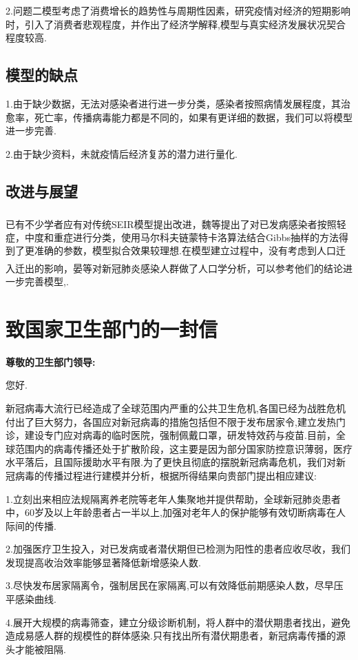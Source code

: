 \documentclass{whutmod}
\newcommand{\upcite}[1]{\textsuperscript{\textsuperscript{\cite{#1}}}}
\begin{document}
	2.问题二模型考虑了消费增长的趋势性与周期性因素，研究疫情对经济的短期影响时，引入了消费者悲观程度，并作出了经济学解释,模型与真实经济发展状况契合程度较高.
	
	\subsection{模型的缺点}
	1.由于缺少数据，无法对感染者进行进一步分类，感染者按照病情发展程度，其治愈率，死亡率，传播病毒能力都是不同的，如果有更详细的数据，我们可以将模型进一步完善.
	
	2.由于缺少资料，未就疫情后经济复苏的潜力进行量化.
	
	\subsection{改进与展望}
	已有不少学者应有对传统SEIR模型提出改进，魏等\upcite{bib:two}提出了对已发病感染者按照轻症，中度和重症进行分类，使用马尔科夫链蒙特卡洛算法结合Gibbs抽样的方法得到了更准确的参数，模型拟合效果较理想.在模型建立过程中，没有考虑到人口迁入迁出的影响，晏等\upcite{bib:seven}对新冠肺炎感染人群做了人口学分析，可以参考他们的结论进一步完善模型,.
	
	
	\section{致国家卫生部门的一封信}
	\textbf{尊敬的卫生部门领导:}
	
	您好.
	
	新冠病毒大流行已经造成了全球范围内严重的公共卫生危机,各国已经为战胜危机付出了巨大努力，各国应对新冠病毒的措施包括但不限于发布居家令,建立发热门诊，建设专门应对病毒的临时医院，强制佩戴口罩，研发特效药与疫苗.目前，全球范围内的病毒传播还处于扩散阶段，这主要是因为部分国家防控意识薄弱，医疗水平落后，且国际援助水平有限.为了更快且彻底的摆脱新冠病毒危机，我们对新冠病毒的传播过程进行建模并分析，根据所得结果向贵部门提出相应建议:
	
	1.立刻出来相应法规隔离养老院等老年人集聚地并提供帮助，全球新冠肺炎患者中，60岁及以上年龄患者占一半以上,加强对老年人的保护能够有效切断病毒在人际间的传播.
	
	2.加强医疗卫生投入，对已发病或者潜伏期但已检测为阳性的患者应收尽收，我们发现提高收治效率能够显著降低新增感染人数.
	
	3.尽快发布居家隔离令，强制居民在家隔离,可以有效降低前期感染人数，尽早压平感染曲线.
	
	4.展开大规模的病毒筛查，建立分级诊断机制，将人群中的潜伏期患者找出，避免造成易感人群的规模性的群体感染.只有找出所有潜伏期患者，新冠病毒传播的源头才能被阻隔.
	
\end{document}
